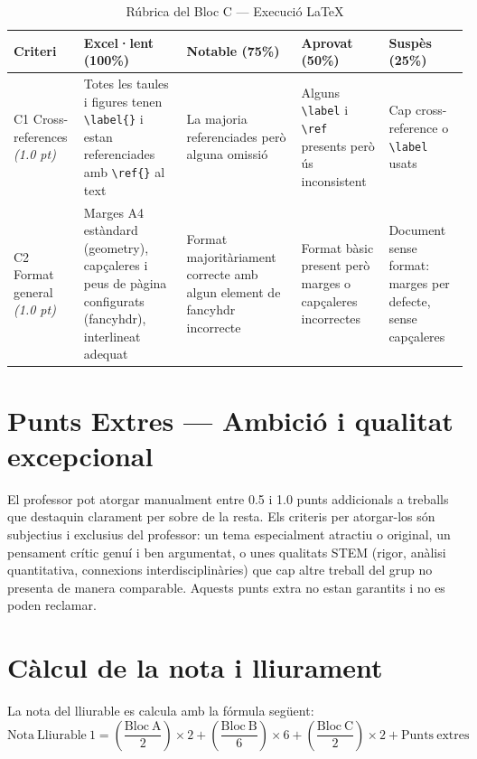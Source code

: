 \documentclass[12pt,a4paper]{article}
\renewcommand{\arraystretch}{1.2}
\begin{document}
\begin{table}[htbp]
  \centering
  \caption{Rúbrica del Bloc C --- Execució LaTeX}
  \label{tab:bloc-c}
  {\footnotesize
  \setlength{\tabcolsep}{4pt}
  \renewcommand{\arraystretch}{1.5}
  \begin{tabularx}{\textwidth}{>{\raggedright\arraybackslash}p{3cm}YYYY}
    \toprule
    \textbf{Criteri} & \textbf{Excel·lent (100\%)} & \textbf{Notable (75\%)} & \textbf{Aprovat (50\%)} & \textbf{Suspès (25\%)} \\
    \midrule
    C1 Cross-references \emph{(1.0 pt)} & Totes les taules i figures tenen \texttt{\textbackslash label\{\}} i estan referenciades amb \texttt{\textbackslash ref\{\}} al text & La majoria referenciades però alguna omissió & Alguns \texttt{\textbackslash label} i \texttt{\textbackslash ref} presents però ús inconsistent & Cap cross-reference o \texttt{\textbackslash label} usats \\
    C2 Format general \emph{(1.0 pt)} & Marges A4 estàndard (geometry), capçaleres i peus de pàgina configurats (fancyhdr), interlineat adequat & Format majoritàriament correcte amb algun element de fancyhdr incorrecte & Format bàsic present però marges o capçaleres incorrectes & Document sense format: marges per defecte, sense capçaleres \\
    \bottomrule
  \end{tabularx}
  }
\end{table}

\section{Punts Extres --- Ambició i qualitat excepcional}

El professor pot atorgar manualment entre 0.5 i 1.0 punts addicionals a treballs que destaquin clarament per sobre de la resta. Els criteris per atorgar-los són subjectius i exclusius del professor: un tema especialment atractiu o original, un pensament crític genuí i ben argumentat, o unes qualitats STEM (rigor, anàlisi quantitativa, connexions interdisciplinàries) que cap altre treball del grup no presenta de manera comparable. Aquests punts extra no estan garantits i no es poden reclamar.

\section{Càlcul de la nota i lliurament}

La nota del lliurable es calcula amb la fórmula següent:
\[
  \mathrm{Nota\ Lliurable\ 1} =
  \left(\frac{\mathrm{Bloc\ A}}{2}\right)\times 2 +
  \left(\frac{\mathrm{Bloc\ B}}{6}\right)\times 6 +
  \left(\frac{\mathrm{Bloc\ C}}{2}\right)\times 2 +
  \mathrm{Punts\ extres}
\]
\end{document}
